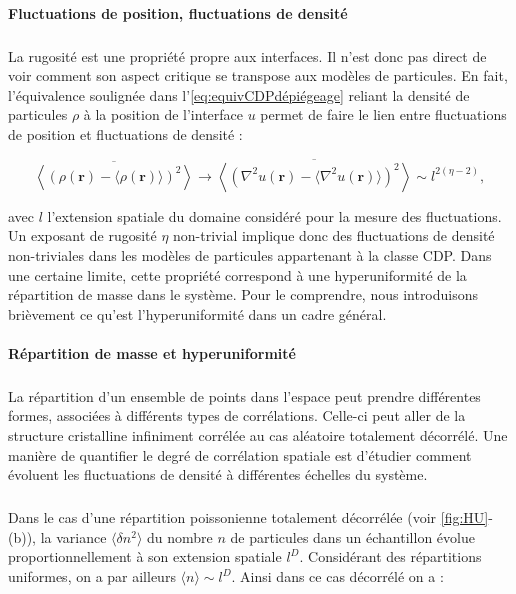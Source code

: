 \paragraph{Fluctuations de position, fluctuations de densité}

\subparagraph{}La rugosité est une propriété propre aux interfaces. Il n'est donc pas direct de voir comment son aspect critique se transpose aux modèles de particules. En fait, l'équivalence soulignée dans l'\autoref{eq:equivCDPdépiégeage} reliant la densité de particules $\rho$ à la position de l'interface $u$ permet de faire le lien entre fluctuations de position et fluctuations de densité :

\begin{equation}
	\overline{\left\langle (\rho(\mathbf{r}) - \langle \rho(\mathbf{r}) \rangle)^2\right\rangle} \rightarrow \overline{\left\langle (\nabla^2 u(\mathbf{r}) - \langle \nabla^2 u(\mathbf{r}) \rangle)^2\right\rangle} \sim l^{2(\eta-2)},
	\label{eq:MappingHyperuni}
\end{equation}

\noindent avec $l$ l'extension spatiale du domaine considéré pour la mesure des fluctuations. Un exposant de rugosité $\eta$ non-trivial implique donc des fluctuations de densité non-triviales dans les modèles de particules appartenant à la classe CDP. Dans une certaine limite, cette propriété correspond à une hyperuniformité de la répartition de masse dans le système. Pour le comprendre, nous introduisons brièvement ce qu'est l'hyperuniformité dans un cadre général.

\paragraph{Répartition de masse et hyperuniformité}

\subparagraph{}La répartition d'un ensemble de points dans l'espace peut prendre différentes formes, associées à différents types de corrélations. Celle-ci peut aller de la structure cristalline infiniment corrélée au cas aléatoire totalement décorrélé. Une manière de quantifier le degré de corrélation spatiale est d'étudier comment évoluent les fluctuations de densité à différentes échelles du système. 

\subparagraph{}Dans le cas d'une répartition poissonienne totalement décorrélée (voir \autoref{fig:HU}-(b)), la variance $\langle \delta n^2 \rangle$ du nombre $n$ de particules dans un échantillon évolue proportionnellement à son extension spatiale $l^D$. Considérant des répartitions uniformes, on a par ailleurs $\langle n \rangle \sim l^D$. Ainsi dans ce cas décorrélé on a :

